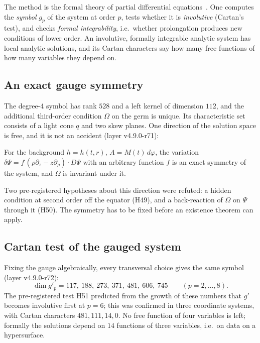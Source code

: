 The method is the formal theory of partial differential equations~\cite{bryant,seiler}.  One computes the \emph{symbol} \(g_p\) of the
system at order \(p\), tests whether it is \emph{involutive} (Cartan's test), and checks \emph{formal integrability}, i.e.\ whether
prolongation produces new conditions of lower order.  An involutive, formally integrable analytic system has local analytic solutions,
and its Cartan characters say how many free functions of how many variables they depend on.

\subsection{An exact gauge symmetry}

The degree-4 symbol has rank \(528\) and a left kernel of dimension \(112\), and the additional third-order condition \(\Omega\) on the
germ is unique.  Its characteristic set consists of a light cone \(q\) and two skew planes.  One direction of the solution space is
free, and it is not an accident (layer v4.9.0-r71):

\begin{proposition}\label{prop:gauge}
For the background \(h=h(t,r)\), \(A=M(t)\,d\varphi\), the variation \(\delta\Psi=f\,(\rho\partial_z-z\partial_\rho)\cdot D\Psi\) with an
arbitrary function \(f\) is an exact symmetry of the system, and \(\Omega\) is invariant under it.
\end{proposition}

Two pre-registered hypotheses about this direction were refuted: a hidden condition at second order off the equator (H49), and a
back-reaction of \(\Omega\) on \(\Psi\) through it (H50).  The symmetry has to be fixed before an existence theorem can apply.

\subsection{Cartan test of the gauged system}

Fixing the gauge algebraically, every transversal choice gives the same symbol (layer v4.9.0-r72):
\[
\dim g'_p=117,\ 188,\ 273,\ 371,\ 481,\ 606,\ 745\qquad(p=2,\dots,8).
\]
The pre-registered test H51 predicted from the growth of these numbers that \(g'\) becomes involutive first at \(p=6\); this was
confirmed in three coordinate systems, with Cartan characters \(481,111,14,0\).  No free function of four variables is left; formally the
solutions depend on \(14\) functions of three variables, i.e.\ on data on a hypersurface.

